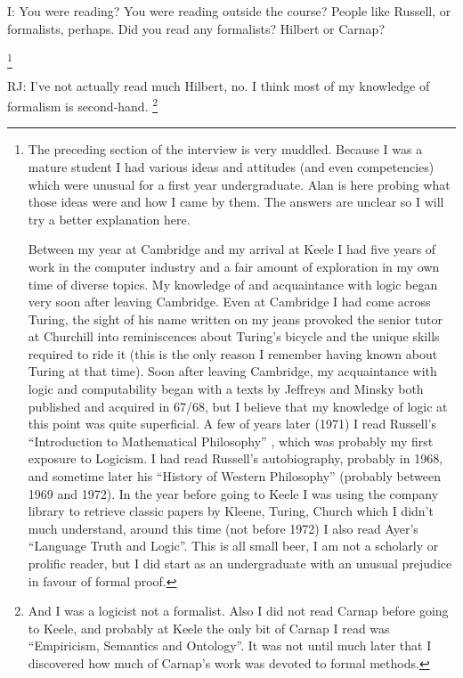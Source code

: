 \documentclass[10pt,titlepage]{book}
\begin{document}
I: You were reading?
You were reading outside the course?
People like Russell, or formalists, perhaps.
Did you read any formalists? Hilbert or Carnap?

\footnote{
The preceding section of the interview is very muddled.
Because I was a mature student I had various ideas and attitudes (and even competencies) which were unusual for a first year undergraduate.
Alan is here probing what those ideas were and how I came by them.
The answers are unclear so I will try a better explanation here.

Between my year at Cambridge and my arrival at Keele I had five years of work in the computer industry and a fair amount of exploration in my own time of diverse topics.
My knowledge of and acquaintance with logic began very soon after leaving Cambridge.
Even at Cambridge I had come across Turing, the sight of his name written on my jeans provoked the senior tutor at Churchill into reminiscences about Turing's bicycle and the unique skills required to ride it (this is the only reason I remember having known about Turing at that time).
Soon after leaving Cambridge, my acquaintance with logic and computability began with a texts by Jeffreys \cite{jeffreys1967} and Minsky \cite{minsky1967} both published and acquired in 67/68, but I believe that my knowledge of logic at this point was quite superficial.
A few of years later (1971) I read Russell's ``Introduction to Mathematical Philosophy'' \cite{russell1919}, which was probably my first exposure to Logicism.
I had read Russell's autobiography\cite{russell}, probably in 1968, and sometime later his ``History of Western Philosophy'' (probably between 1969 and 1972).
In the year before going to Keele I was using the company library to retrieve classic papers by Kleene, Turing, Church which I didn't much understand, around this time (not before 1972) I also read Ayer's ``Language Truth and Logic''\cite{ayer1936}.
This is all small beer, I am not a scholarly or prolific reader, but I did start as an undergraduate with an unusual prejudice in favour of formal proof.
}

RJ: I've not actually read much Hilbert, no.
I think most of my knowledge of formalism is second-hand.%
\footnote{And I was a logicist not a formalist.
Also I did not read Carnap before going to Keele, and probably at Keele the only bit of Carnap I read was ``Empiricism, Semantics and Ontology''\cite{carnap50}.
It was not until much later that I discovered how much of Carnap's work was devoted to formal methods.}%
\end{document}
